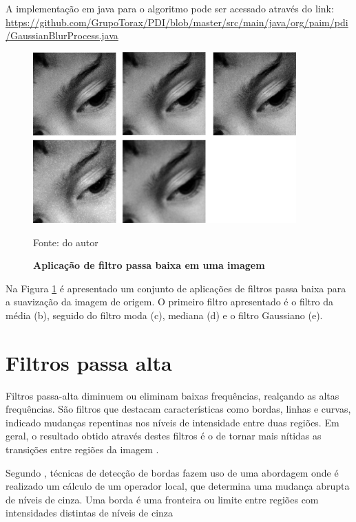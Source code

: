 \documentclass[
	12pt,				%
	oneside,			%
	a4paper,			%
	english,			%
	french,				%
	spanish,			%
	brazil,				%
	]{abntex2}
\begin{document}
A implementação em java para o algoritmo pode ser acessado através do link:
\url{https://github.com/GrupoTorax/PDI/blob/master/src/main/java/org/paim/pdi/GaussianBlurProcess.java}

\begin{figure}[ht]
\centering
\caption{\textbf{Aplicação de filtro passa baixa em uma imagem}}
\includegraphics[width=0.9\textwidth]{imagens/suavizacao.png}

Fonte: do autor
\label{fig:suavizacao}
\end{figure}

Na Figura \ref{fig:suavizacao} é apresentado um conjunto de aplicações de filtros passa baixa para a suavização da imagem de origem. O primeiro filtro apresentado é o filtro da média (b), seguido do filtro moda (c), mediana (d) e o filtro Gaussiano (e).

\section{Filtros passa alta}

Filtros passa-alta diminuem ou eliminam baixas frequências, realçando as altas frequências. São filtros que destacam características como bordas, linhas e curvas, indicado mudanças repentinas nos níveis de intensidade entre duas regiões. Em geral, o resultado obtido através destes filtros é o de tornar mais nítidas as transições entre regiões da imagem \cite{conciAzevedoLeta:2008}.

Segundo \citet{pedriniSchwartz:2008}, técnicas de detecção de bordas fazem uso de uma abordagem onde é realizado um cálculo de um operador local, que determina uma mudança abrupta de níveis de cinza. Uma borda é uma fronteira ou limite entre regiões com intensidades distintas de níveis de cinza
\end{document}

